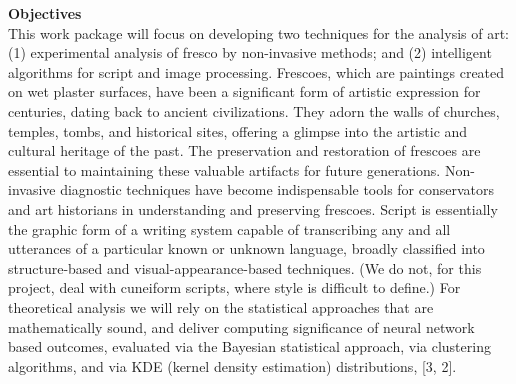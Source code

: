 \textbf{Objectives}\\
This work package will focus on developing two techniques for the analysis of art: (1) experimental analysis of fresco by non-invasive methods; and (2) intelligent algorithms for script and image processing. Frescoes, which are paintings created on wet plaster surfaces, have been a significant form of artistic expression for centuries, dating back to ancient civilizations. They adorn the walls of churches, temples, tombs, and historical sites, offering a glimpse into the artistic and cultural heritage of the past. The preservation and restoration of frescoes are essential to maintaining these valuable artifacts for future generations. Non-invasive diagnostic techniques have become indispensable tools for conservators and art historians in understanding and preserving frescoes. Script is essentially the graphic form of a writing system capable of transcribing any and all utterances of a particular known or unknown language, broadly classified into structure-based and visual-appearance-based techniques. (We do not, for this project, deal with cuneiform scripts, where style is difficult to define.) For theoretical analysis we will rely on the statistical approaches that are mathematically sound, and deliver computing significance of neural network based outcomes, evaluated via the Bayesian statistical approach, via clustering algorithms, and via KDE (kernel density estimation) distributions, [3, 2].
\par


